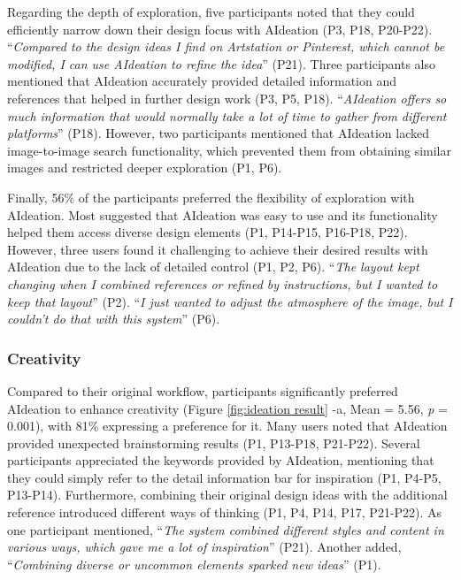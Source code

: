 Regarding the depth of exploration, five participants noted that they could efficiently narrow down their design focus with AIdeation (P3, P18, P20-P22). “\textit{Compared to the design ideas I find on Artstation or Pinterest, which cannot be modified, I can use AIdeation to refine the idea}” (P21). Three participants also mentioned that AIdeation accurately provided detailed information and references that helped in further design work (P3, P5, P18). “\textit{AIdeation offers so much information that would normally take a lot of time to gather from different platforms}” (P18). However, two participants mentioned that AIdeation lacked image-to-image search functionality, which prevented them from obtaining similar images and restricted deeper exploration (P1, P6).

Finally, 56\% of the participants preferred the flexibility of exploration with AIdeation. Most suggested that AIdeation was easy to use and its functionality helped them access diverse design elements (P1, P14-P15, P16-P18, P22). However, three users found it challenging to achieve their desired results with AIdeation due to the lack of detailed control (P1, P2, P6). “\textit{The layout kept changing when I combined references or refined by instructions, but I wanted to keep that layout}” (P2). “\textit{I just wanted to adjust the atmosphere of the image, but I couldn't do that with this system}” (P6).


\subsubsection{Creativity}
Compared to their original workflow, participants significantly preferred AIdeation to enhance creativity (Figure \ref{fig:ideation result} -a, Mean = 5.56, \textit{p} = 0.001), with 81\% expressing a preference for it. Many users noted that AIdeation provided unexpected brainstorming results (P1, P13-P18, P21-P22). Several participants appreciated the keywords provided by AIdeation, mentioning that they could simply refer to the detail information bar for inspiration (P1, P4-P5, P13-P14). Furthermore, combining their original design ideas with the additional reference introduced different ways of thinking (P1, P4, P14, P17, P21-P22). As one participant mentioned, “\textit{The system combined different styles and content in various ways, which gave me a lot of inspiration}” (P21). Another added, “\textit{Combining diverse or uncommon elements sparked new ideas}” (P1).

